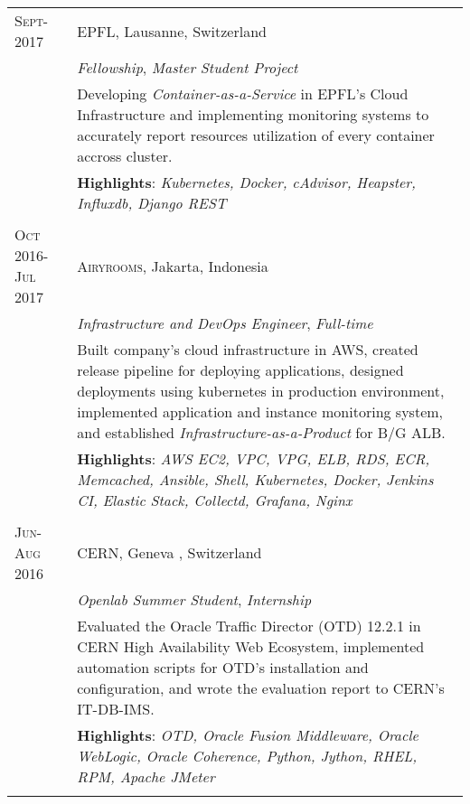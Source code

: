 \documentclass[a4paper,10pt]{article} %
\begin{document}
\begin{tabular}{lp{12cm}}
\textsc{Sept- 2017} & \textsc{EPFL}, Lausanne, Switzerland \\
& \emph{Fellowship}, \textit{Master Student Project}\\ 
& \footnotesize{Developing \textit{Container-as-a-Service} in EPFL's Cloud Infrastructure and implementing monitoring systems to accurately report resources utilization of every container accross cluster.}\\
& \footnotesize{\textbf{Highlights}: \textit{Kubernetes, Docker, cAdvisor, Heapster, Influxdb, Django REST}}\\
\multicolumn{2}{c}{} \\

\textsc{Oct 2016-Jul 2017} & \textsc{Airyrooms}, Jakarta, Indonesia \\
& \emph{Infrastructure and DevOps Engineer}, \textit{Full-time}\\ 
& \footnotesize{Built company's cloud infrastructure in AWS, created release pipeline for deploying applications, designed deployments using kubernetes in production environment, implemented application and instance monitoring system, and established \textit{Infrastructure-as-a-Product} for B/G ALB.}\\
& \footnotesize{\textbf{Highlights}: \textit{AWS EC2, VPC, VPG, ELB, RDS, ECR, Memcached, Ansible, Shell, Kubernetes, Docker, Jenkins CI, Elastic Stack, Collectd, Grafana, Nginx}}\\
\multicolumn{2}{c}{} \\


\textsc{Jun-Aug 2016} & \textsc{CERN}, Geneva , Switzerland \\
& \emph{Openlab Summer Student}, \textit{Internship}\\ 
& \footnotesize{Evaluated the Oracle Traffic Director (OTD) 12.2.1 in CERN High Availability Web Ecosystem, implemented automation scripts for OTD's installation and configuration, and wrote the evaluation report to CERN's IT-DB-IMS.}\\
& \footnotesize{\textbf{Highlights}: \textit{OTD, Oracle Fusion Middleware, Oracle WebLogic, Oracle Coherence, Python, Jython, RHEL, RPM, Apache JMeter}}\\
\multicolumn{2}{c}{} \\



\end{tabular}
\end{document}
